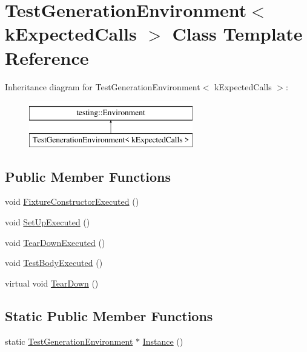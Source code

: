 \hypertarget{classTestGenerationEnvironment}{}\section{Test\+Generation\+Environment$<$ k\+Expected\+Calls $>$ Class Template Reference}
\label{classTestGenerationEnvironment}
Inheritance diagram for Test\+Generation\+Environment$<$ k\+Expected\+Calls $>$\+:\begin{figure}[H]
\begin{center}
\leavevmode
\includegraphics[height=2.000000cm]{classTestGenerationEnvironment}
\end{center}
\end{figure}
\subsection*{Public Member Functions}
\begin{DoxyCompactItemize}
\item 
void \mbox{\hyperlink{classTestGenerationEnvironment_abcdae77887fbd6dba18f4a55b80f058d}{Fixture\+Constructor\+Executed}} ()
\item 
void \mbox{\hyperlink{classTestGenerationEnvironment_aa17c620af5eb9929bdbde25820cd8e28}{Set\+Up\+Executed}} ()
\item 
void \mbox{\hyperlink{classTestGenerationEnvironment_a0d2576b10818bae1945e17e6e749ff9b}{Tear\+Down\+Executed}} ()
\item 
void \mbox{\hyperlink{classTestGenerationEnvironment_a358a1d7cbefc3f9157f625f87dbde754}{Test\+Body\+Executed}} ()
\item 
virtual void \mbox{\hyperlink{classTestGenerationEnvironment_ac3787d8afb43b97b0b3d6dec78b04798}{Tear\+Down}} ()
\end{DoxyCompactItemize}
\subsection*{Static Public Member Functions}
\begin{DoxyCompactItemize}
\item 
static \mbox{\hyperlink{classTestGenerationEnvironment}{Test\+Generation\+Environment}} $\ast$ \mbox{\hyperlink{classTestGenerationEnvironment_a5b8e14f430fe11d558c0e4482cebd694}{Instance}} ()
\end{DoxyCompactItemize}


